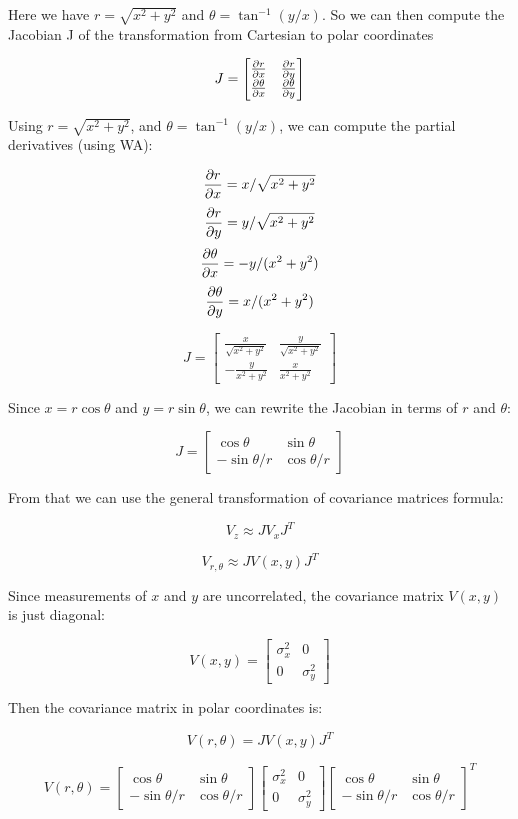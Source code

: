 \documentclass[10pt]{article}
\begin{document}
Here we have $r = \sqrt{x^2 + y^2}$ and $\theta = \tan^{-1}(y/x)$. So we can then compute the Jacobian J of the transformation from Cartesian to polar coordinates

\[ J = \begin{bmatrix}
		\pdv{r}{x}      & \pdv{r}{y}      \\
		\pdv{\theta}{x} & \pdv{\theta}{y}
	\end{bmatrix} \]

Using $r = \sqrt{x^2 + y^2}$, and $\theta = \tan^{-1}(y/x)$, we can compute the partial derivatives (using WA):

\[ \pdv{r}{x} = x / \sqrt{x^2 + y^2} \]
\[ \pdv{r}{y} = y / \sqrt{x^2 + y^2} \]
\[ \pdv{\theta}{x} = -y / (x^2 + y^2) \]
\[ \pdv{\theta}{y} = x / (x^2 + y^2) \]


\[ J = \begin{bmatrix}
		\frac{x}{\sqrt{x^2 + y^2}} & \frac{y}{\sqrt{x^2 + y^2}} \\
		-\frac{y}{x^2 + y^2}       & \frac{x}{x^2 + y^2}
	\end{bmatrix} \]

Since $x = r\cos\theta$ and $y = r\sin\theta$, we can rewrite the Jacobian in terms of $r$ and $\theta$:

\[ J = \begin{bmatrix}
		\cos\theta    & \sin\theta   \\
		-\sin\theta/r & \cos\theta/r
	\end{bmatrix} \]

From that we can use the general transformation of covariance matrices formula:

\[ V_z \approx J V_x J^T \]

\[ V_{r,\theta} \approx J V(x,y) J^T \]

Since measurements of $x$ and $y$ are uncorrelated, the covariance matrix $V(x,y)$ is just diagonal:

\[ V(x,y) = \begin{bmatrix}
		\sigma_x^2 & 0          \\
		0          & \sigma_y^2
	\end{bmatrix} \]

Then the covariance matrix in polar coordinates is:

\[ V(r,\theta) = J V(x,y) J^T \]

\[ V(r,\theta) = \begin{bmatrix}
		\cos\theta    & \sin\theta   \\
		-\sin\theta/r & \cos\theta/r
	\end{bmatrix}\begin{bmatrix}
		\sigma_x^2 & 0          \\
		0          & \sigma_y^2
	\end{bmatrix} \begin{bmatrix}
		\cos\theta    & \sin\theta   \\
		-\sin\theta/r & \cos\theta/r
	\end{bmatrix}^T\]
\end{document}

